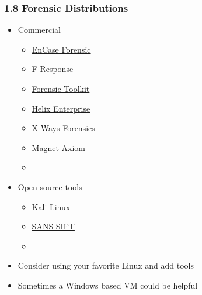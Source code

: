 \begin{frame}
  \frametitle{1.8 Forensic Distributions}
  \begin{itemize}
      \item Commercial
        \begin{itemize}
            \item[] \href{https://www.guidancesoftware.com/encase-forensic}{EnCase Forensic}
            \item[] \href{https://www.f-response.com/}{F-Response}
            \item[] \href{https://accessdata.com/products-services/forensic-toolkit-ftk}{Forensic Toolkit}
            \item[] \href{http://www.e-fense.com/products.php}{Helix Enterprise}
            \item[] \href{http://www.x-ways.net/forensics/index-d.html}{X-Ways Forensics}
            \item[] \href{https://www.magnetforensics.com/magnet-axiom/}{Magnet Axiom}
            \item[]
        \end{itemize}
      \item Open source tools
        \begin{itemize}
            \item[] \href{https://www.kali.org/}{Kali Linux}
            \item[] \href{https://www.sans.org/tools/sift-workstation/}{SANS SIFT}
            \item[]
        \end{itemize}
      \item Consider using your favorite Linux and add tools
      \item Sometimes a Windows based VM could be helpful
  \end{itemize}
\end{frame}



